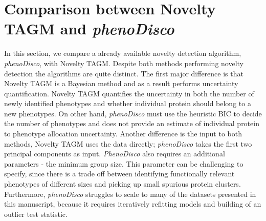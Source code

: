 \documentclass[12pt,english]{article}
\begin{document}
\section{Comparison between Novelty TAGM and \textit{phenoDisco}}
In this section, we compare a already available novelty detection algorithm, \textit{phenoDisco}, with Novelty TAGM. Despite both methods performing novelty detection the algorithms
are quite distinct. The first major difference is that Novelty TAGM is a Bayesian 
method and as a result performs uncertainty quantification. Novelty TAGM quantifies the uncertainty in both the number of newly identified phenotypes and whether individual protein should belong to a new phenotypes. On other hand, \textit{phenoDisco} must use the heuristic BIC to decide the number of phenotypes and does not provide an estimate of individual protein to phenotype allocation uncertainty. Another difference is the input to both methods, Novelty TAGM uses the data directly; \textit{phenoDisco} takes the first two principal components as input. \textit{PhenoDisco} also requires an additional parameters - the minimum group size. This parameter can be challenging to specify, since there is a trade off between identifying functionally relevant phenotypes of different sizes and picking up small spurious protein clusters. Furthermore, \textit{phenoDisco} struggles to scale to many of the datasets presented in this manuscript, because it requires iteratively refitting models and building of an outlier test statistic. 
\end{document}
